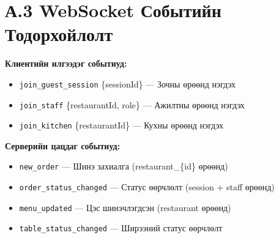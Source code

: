 \section*{А.3 WebSocket Событийн Тодорхойлолт}

\textbf{Клиентийн илгээдэг событиуд:}
\begin{itemize}
    \item \texttt{join\_guest\_session} \{sessionId\} — Зочны өрөөнд нэгдэх
    \item \texttt{join\_staff} \{restaurantId, role\} — Ажилтны өрөөнд нэгдэх
    \item \texttt{join\_kitchen} \{restaurantId\} — Кухны өрөөнд нэгдэх
\end{itemize}

\textbf{Серверийн цацдаг событиуд:}
\begin{itemize}
    \item \texttt{new\_order} — Шинэ захиалга (restaurant\_\{id\} өрөөнд)
    \item \texttt{order\_status\_changed} — Статус өөрчлөлт (session + staff өрөөнд)
    \item \texttt{menu\_updated} — Цэс шинэчлэгдсэн (restaurant өрөөнд)
    \item \texttt{table\_status\_changed} — Ширээний статус өөрчлөлт
\end{itemize}
